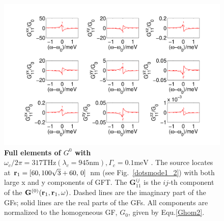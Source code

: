 \begin{figure}[H]
\centering
\begin{center}
\includegraphics[width=16cm]{./Figs/G84_11_4}
\end{center}
\caption[Full elements of $G^0$ with $\omega_c/2\pi = 317 {\text {THz}} (\lambda_c=945 {\text {nm}}), \Gamma_c = 0.1 {\text {meV}}$]{\textbf{Full elements of $G^0$ with $\omega_c/2\pi = 317 {\text {THz}} (\lambda_c=945 {\text {nm}}), \Gamma_c = 0.1 {\text {meV}}$ }. The source locates at  $\mathbf{r}_1=[60,100\sqrt{3}+60,\, 0]$ nm (see Fig.~\ref{dotsmode1_2}) with both large x and y components of GFT. The $\mathbf{G}^{ij}_{11}$ is the $ij$-th component of the $\mathbf{G}^{(0)}(\mathbf{r}_1,\mathbf{r}_1,\omega)$. Dashed lines are the imaginary part of the GFs; solid lines are the real parts of the GFs. All components are normalized to the homogeneous GF, $G_0$, given by Equ.\eqref{Ghom2}. }
\label{G84_11_4}
\end{figure}

